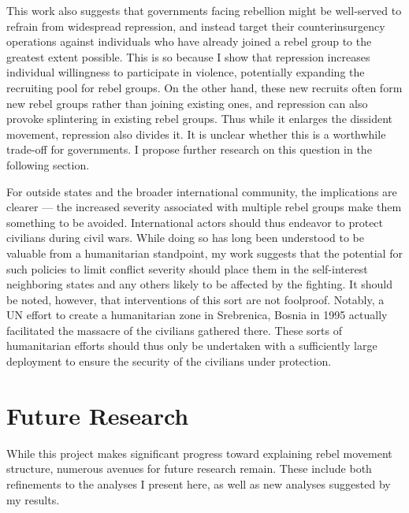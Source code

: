 \documentclass[12pt,]{book}
\theoremstyle{definition}
\theoremstyle{definition}
\theoremstyle{definition}
\theoremstyle{remark}
\begin{document}
This work also suggests that governments facing rebellion might be
well-served to refrain from widespread repression, and instead target
their counterinsurgency operations against individuals who have already
joined a rebel group to the greatest extent possible. This is so because
I show that repression increases individual willingness to participate
in violence, potentially expanding the recruiting pool for rebel groups.
On the other hand, these new recruits often form new rebel groups rather
than joining existing ones, and repression can also provoke splintering
in existing rebel groups. Thus while it enlarges the dissident movement,
repression also divides it. It is unclear whether this is a worthwhile
trade-off for governments. I propose further research on this question
in the following section.

For outside states and the broader international community, the
implications are clearer --- the increased severity associated with
multiple rebel groups make them something to be avoided. International
actors should thus endeavor to protect civilians during civil wars.
While doing so has long been understood to be valuable from a
humanitarian standpoint, my work suggests that the potential for such
policies to limit conflict severity should place them in the
self-interest neighboring states and any others likely to be affected by
the fighting. It should be noted, however, that interventions of this
sort are not foolproof. Notably, a UN effort to create a humanitarian
zone in Srebrenica, Bosnia in 1995 actually facilitated the massacre of
the civilians gathered there. These sorts of humanitarian efforts should
thus only be undertaken with a sufficiently large deployment to ensure
the security of the civilians under protection.

\hypertarget{future-research}{%
\section{Future Research}\label{future-research}}

While this project makes significant progress toward explaining rebel
movement structure, numerous avenues for future research remain. These
include both refinements to the analyses I present here, as well as new
analyses suggested by my results.
\end{document}

